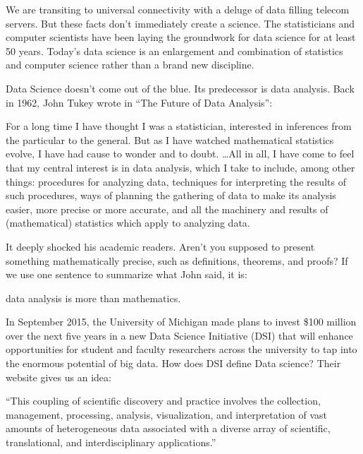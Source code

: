 \documentclass[12pt,]{krantz}
\renewenvironment{quote}{\begin{VF}}{\end{VF}}
\theoremstyle{definition}
\theoremstyle{definition}
\theoremstyle{remark}
\begin{document}
We are transiting to universal connectivity with a deluge of data
filling telecom servers. But these facts don't immediately create a
science. The statisticians and computer scientists have been laying the
groundwork for data science for at least 50 years. Today's data science
is an enlargement and combination of statistics and computer science
rather than a brand new discipline.

Data Science doesn't come out of the blue. Its predecessor is data
analysis. Back in 1962, John Tukey wrote in ``The Future of Data
Analysis'':

\begin{quote}
For a long time I have thought I was a statistician, interested in
inferences from the particular to the general. But as I have watched
mathematical statistics evolve, I have had cause to wonder and to doubt.
\ldots{}All in all, I have come to feel that my central interest is in
data analysis, which I take to include, among other things: procedures
for analyzing data, techniques for interpreting the results of such
procedures, ways of planning the gathering of data to make its analysis
easier, more precise or more accurate, and all the machinery and results
of (mathematical) statistics which apply to analyzing data.
\end{quote}

It deeply shocked his academic readers. Aren't you supposed to present
something mathematically precise, such as definitions, theorems, and
proofs? If we use one sentence to summarize what John said, it is:

\begin{quote}
data analysis is more than mathematics.
\end{quote}

In September 2015, the University of Michigan made plans to invest \$100
million over the next five years in a new Data Science Initiative (DSI)
that will enhance opportunities for student and faculty researchers
across the university to tap into the enormous potential of big data.
How does DSI define Data science? Their website gives us an idea:

\begin{quote}
``This coupling of scientific discovery and practice involves the
collection, management, processing, analysis, visualization, and
interpretation of vast amounts of heterogeneous data associated with a
diverse array of scientific, translational, and interdisciplinary
applications.''
\end{quote}
\end{document}

